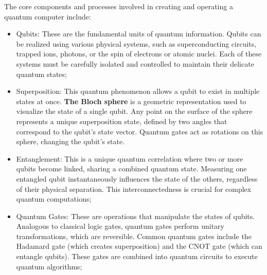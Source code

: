 \documentclass{article}
\begin{document}
The core components and processes involved in creating and operating a quantum computer include:
\begin{itemize}
  \item Qubits: These are the fundamental units of quantum information. Qubits can be realized using various physical systems, such as superconducting circuits, trapped ions, photons, or the spin of electrons or atomic nuclei. Each of these systems must be carefully isolated and controlled to maintain their delicate quantum states;
  
  \item Superposition: This quantum phenomenon allows a qubit to exist in multiple states at once.
  \textbf{The Bloch sphere} is a geometric representation used to visualize the state of a single qubit. Any point on the surface of the sphere represents a unique superposition state, defined by two angles that correspond to the qubit's state vector. Quantum gates act as rotations on this sphere, changing the qubit's state.
  
  \item Entanglement: This is a unique quantum correlation where two or more qubits become linked, sharing a combined quantum state. Measuring one entangled qubit instantaneously influences the state of the others, regardless of their physical separation. This interconnectedness is crucial for complex quantum computations;
  
  \item Quantum Gates: These are operations that manipulate the states of qubits. Analogous to classical logic gates, quantum gates perform unitary transformations, which are reversible. Common quantum gates include the Hadamard gate (which creates superposition) and the CNOT gate (which can entangle qubits). These gates are combined into quantum circuits to execute quantum algorithms;
\end{itemize}
 
\end{document}
